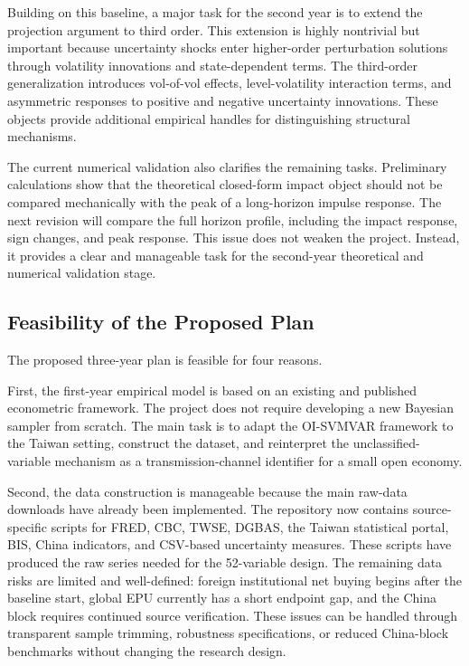 \documentclass[12pt]{article}
\begin{document}
Building on this baseline, a major task for the second year is to extend the projection argument to third order. This extension is highly nontrivial but
important because uncertainty shocks enter higher-order perturbation solutions through
volatility innovations and state-dependent terms. The third-order generalization introduces
vol-of-vol effects, level-volatility interaction terms, and asymmetric responses to positive and
negative uncertainty innovations. These objects provide additional empirical handles for
distinguishing structural mechanisms.

The current numerical validation also clarifies the remaining tasks. Preliminary calculations show
that the theoretical closed-form impact object should not be compared mechanically with the
peak of a long-horizon impulse response. The next revision will compare the full horizon profile,
including the impact response, sign changes, and peak response. This issue does not weaken the
project. Instead, it provides a clear and manageable task for the second-year theoretical and
numerical validation stage.

\subsection{Feasibility of the Proposed Plan}

The proposed three-year plan is feasible for four reasons.

First, the first-year empirical model is based on an existing and published econometric framework.
The project does not require developing a new Bayesian sampler from scratch. The main task is
to adapt the OI-SVMVAR framework to the Taiwan setting, construct the dataset, and reinterpret
the unclassified-variable mechanism as a transmission-channel identifier for a small open economy.

Second, the data construction is manageable because the main raw-data downloads have already
been implemented. The repository now contains source-specific scripts for FRED, CBC, TWSE,
DGBAS, the Taiwan statistical portal, BIS, China indicators, and CSV-based uncertainty measures.
These scripts have produced the raw series needed for the 52-variable design. The remaining data
risks are limited and well-defined: foreign institutional net buying begins after the baseline
start, global EPU currently has a short endpoint gap, and the China block requires continued
source verification. These issues can be handled through transparent sample trimming,
robustness specifications, or reduced China-block benchmarks without changing the research
design.
\end{document}
